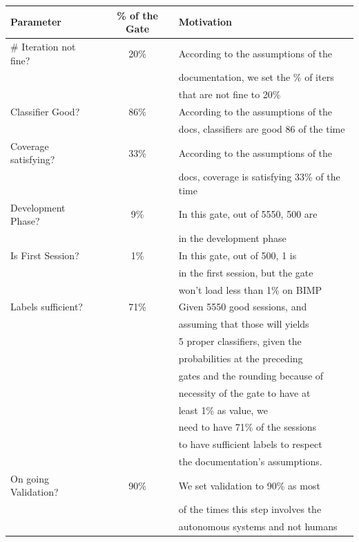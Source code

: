 \begin{table}[H]
    \centering
    \begin{tabularx}{\textwidth}{|X|c|l|}
    \hline
    \textbf{Parameter} & \textbf{\% of the Gate} & \textbf{Motivation} \\
    \hline
     \# Iteration not fine? & 20\% & According to the assumptions of the \\
     & & documentation, we set the \% of iters \\
     & & that are not fine to 20\% \\
    \hline
    Classifier Good? & 86\% & According to the assumptions of the \\
     & & docs, classifiers are good 86 of the time \\
    \hline
    Coverage satisfying? & 33\% & According to the assumptions of the \\
     & & docs, coverage is satisfying 33\% of the time \\
    \hline
    Development Phase? & 9\% & In this gate, out of 5550, 500 are \\
     & & in the development phase \\
    \hline
    Is First Session? & 1\% & In this gate, out of 500, 1 is 
    \\ & & in the first session, but the gate
    \\ & & won't load less than 1\% on BIMP 
    \\
    \hline
    Labels sufficient? & 71\% & Given 5550 good sessions, and 
    \\ & & assuming that those will yields
    \\ & & 5 proper classifiers, given the 
    \\ & & probabilities at the preceding 
    \\ & & gates and the rounding because of 
    \\ & & necessity of the gate to have at 
    \\ & & least 1\% as value, we 
    \\ & & need to have 71\% of the sessions 
    \\ & & to have sufficient labels to respect 
    \\ & & the documentation's assumptions.
    \\
    \hline
    On going Validation? & 90\% & We set validation to 90\% as most
    \\ & & of the times this step involves the
    \\ & & autonomous systems and not humans \\

\end{tabularx}
\end{table}
